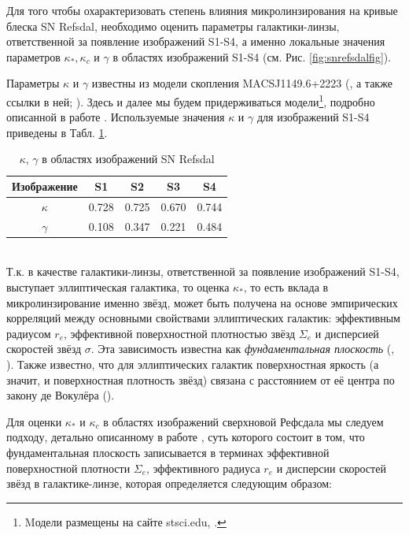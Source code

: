 Для того чтобы охарактеризовать степень влияния микролинзирования на кривые блеска SN Refsdal, необходимо оценить параметры галактики-линзы, ответственной за появление изображений S1-S4, а именно локальные значения параметров $\kappa_*, \kappa_c$ и $\gamma$ в областях изображений S1-S4  (см. Рис. \ref{fig:snrefsdalfig}). 

Параметры $\kappa$ и $\gamma$ известны из модели скопления MACSJ1149.6+2223 (\cite{treu2015}, а также ссылки в ней; \cite{hubblemaps}). Здесь и далее мы будем придерживаться модели\footnote{Mодели размещены на сайте stsci.edu, \cite{hlsp}.}, подробно описанной в работе \cite{kawamataoguri}. Используемые значения $\kappa$ и $\gamma$ для изображений S1-S4 приведены в Табл. \ref{tab:kappagamma}.

\begin{table}[h!]
  \caption{$\kappa$, $\gamma$ в областях изображений SN Refsdal}
  \label{tab:kappagamma}
  \centering
    \begin{tabular}{ | c | c | c | c | c |}
    \hline
    Изображение & S1 & S2 & S3 & S4 \\ \hline
    $\kappa$ & 0.728 & 0.725 & 0.670 & 0.744 \\ \hline
    $\gamma$ & 0.108 & 0.347 & 0.221 & 0.484 \\
    \hline
    \end{tabular}
\end{table}
\\
Т.к. в качестве галактики-линзы, ответственной за появление изображений S1-S4, выступает эллиптическая галактика, то оценка $\kappa_*$, то есть вклада в микролинзирование именно звёзд, может быть получена на основе эмпирических корреляций между основными свойствами эллиптических галактик: эффективным радиусом $r_e$, эффективной поверхностной плотностью звёзд $\Sigma_e$ и дисперсией скоростей звёзд $\sigma$. Эта зависимость известна как \textit{фундаментальная плоскость} (\cite{djorgovski&davis1987}, \cite{hydebernardi2009}). Также известно, что для эллиптических галактик поверхностная яркость (а значит, и поверхностная плотность звёзд) связана с расстоянием от её центра по закону де Вокулёра (\cite{vaucouleurs}).

Для оценки $\kappa_*$ и $\kappa_c$ в областях изображений сверхновой Рефсдала мы следуем подходу, детально описанному в работе \cite{schechter2014}, суть которого состоит в том, что фундаментальная плоскость записывается в терминах эффективной поверхностной плотности $\Sigma_{e}$, эффективного радиуса $r_e$ и дисперсии скоростей звёзд в галактике-линзе, которая определяется следующим образом:

